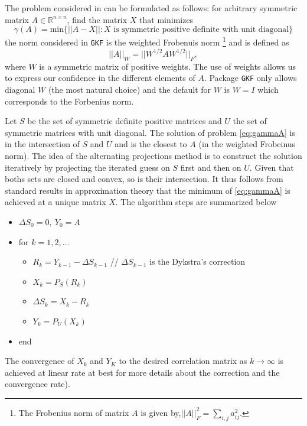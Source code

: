 \documentclass{article}
\newcommand{\GKF}{\texttt{GKF}\xspace}
\begin{document}
The problem considered in \citet{higham2002computing} can be formulated as follows: for
arbitrary symmetric matrix $A \in \mathbb{R}^{n \times n}$, find the matrix $X$ that
minimizes
\begin{equation}
 \gamma(A)
 = \text{min} \big\{ ||A-X ||: X \text{ is symmetric positive definite with unit diagonal} \big\}
 \label{eq:gammaA}
\end{equation}
the norm considered in \GKF is the weighted Frobenuis norm \footnote{The Frobenius norm of
  matrix $A$ is given by,$ ||A||_F^2=\sum_{i,j} a_{ij}^2 $.} and is defined as
\begin{equation*}
  ||A||_W = ||W^{1/2}A W^{1/2} ||_F
  ,
\end{equation*}
where $W$ is a symmetric matrix of positive weights. The use of weights allows us to express
our confidence in the different elements of $A$. Package \GKF only allows diagonal $W$ (the
most natural choice) and the default for $W$ is $W=I$ which corresponds to the Forbenius
norm.

Let $S$ be the set of symmetric definite positive matrices and $U$ the set of symmetric
matrices with unit diagonal.  The solution of problem \eqref{eq:gammaA} is in the
intersection of $S$ and $U$ and is the closest to $A$ (in the weighted Frobeinus norm).  The
idea of the alternating projections method is to construct the solution iteratively by
projecting the iterated guess on $S$ first and then on $U$. Given that boths sets are closed
and convex, so is their intersection. It thus follows from standard results in approximation
theory that the minimum of \eqref{eq:gammaA} is achieved at a unique matrix $X$. The
algorithm steps are summarized below
\begin{itemize}
  \item $\Delta S_0=0, \  Y_0=A $
  \item for $k=1,2,\dots $
    \begin{itemize}
    \item $R_k=Y_{k-1} - \Delta S_{k-1}$ // $\Delta S_{k-1}$ is the Dykstra's correction
    \item $X_k= P_S(R_k)$
    \item $\Delta S_k= X_k - R_k$
    \item $Y_k = P_U(X_k)$
    \end{itemize}
  \item end
\end{itemize}
The convergence of $X_k$ and $Y_K$ to the desired correlation matrix as
$k \rightarrow \infty$ is achieved at linear rate at best \citep[see ]{boyle1986method} for
more details about the correction and the convergence rate).
\end{document}
